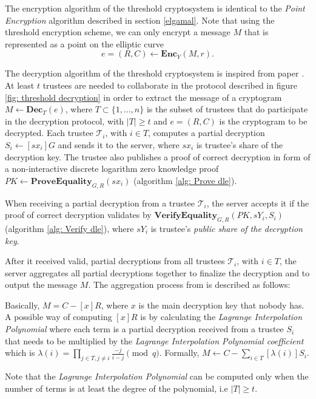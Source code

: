 The encryption algorithm of the threshold cryptosystem is identical to the \textit{Point Encryption} algorithm described in section \ref{elgamal}. Note that using the threshold encryption scheme, we can only encrypt a message $M$ that is represented as a point on the elliptic curve
\[
e = (R, C) \leftarrow \mathbf{Enc}_Y(M, r).
\]

The decryption algorithm of the threshold cryptosystem is inspired from paper \cite{Desmedt89}. At least $t$ trustees are needed to collaborate in the protocol described in figure \ref{fig: threshold decryption} in order to extract the message of a cryptogram \( M \leftarrow \mathbf{Dec}_T(e) \), where \( T \subset \{ 1, ..., n \} \) is the subset of trustees that do participate in the decryption protocol, with \( |T| \geq t \) and \( e = (R, C) \) is the cryptogram to be decrypted. 
Each trustee $\mathcal{T}_i$, with \( i \in T \), computes a partial decryption \( S_i \gets [sx_i]G \) and sends it to the server, where $sx_i$ is trustee's share of the decryption key. The trustee also publishes a proof of correct decryption in form of a non-interactive discrete logarithm zero knowledge proof \( PK \leftarrow \mathbf{ProveEquality}_{G, R} (sx_i) \) (algorithm \ref{alg: Prove dle}).

When receiving a partial decryption from a trustee $\mathcal{T}_i$, the server accepts it if the proof of correct decryption validates by \( \mathbf{VerifyEquality}_{G, R} (PK, sY_i, S_i) \) (algorithm \ref{alg: Verify dle}), where $sY_i$ is trustee's \textit{public share of the decryption key}.

After it received valid, partial decryptions from all trustees $\mathcal{T}_i$, with \( i \in T \), the server aggregates all partial decryptions together to finalize the decryption and to output the message $M$. The aggregation process from \cite{Desmedt89} is described as follows:

Basically, \( M = C - [x]R \), where $x$ is the main decryption key that nobody has. A possible way of computing $[x]R$ is by calculating the \textit{Lagrange Interpolation Polynomial} where each term is a partial decryption received from a trustee $S_i$ that needs to be multiplied by the \textit{Lagrange Interpolation Polynomial coefficient} which is \( \lambda(i) = \prod_{j \in T, j \neq i} \frac{-j}{i-j} \pmod q \). Formally, \( M \gets C - \sum_{i \in T} [\lambda(i)]S_i \).

Note that the \textit{Lagrange Interpolation Polynomial} can be computed only when the number of terms is at least the degree of the polynomial, i.e \( |T| \geq t \).


